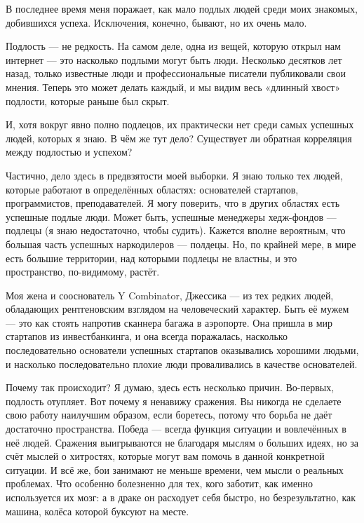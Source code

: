 \documentclass[ebook,12pt,oneside,openany]{memoir}
\date{}
\begin{document}
\maketitle

В последнее время меня поражает, как мало подлых людей среди моих
знакомых, добившихся успеха. Исключения, конечно, бывают, но их очень
мало. \newline

Подлость — не редкость. На самом деле, одна из вещей, которую открыл
нам интернет — это насколько подлыми могут быть люди. Несколько
десятков лет назад, только известные люди и профессиональные писатели
публиковали свои мнения. Теперь это может делать каждый, и мы видим
весь «длинный хвост» подлости, которые раньше был скрыт. \newline

И, хотя вокруг явно полно подлецов, их практически нет среди самых
успешных людей, которых я знаю. В чём же тут дело? Существует ли
обратная корреляция между подлостью и успехом? \newline

Частично, дело здесь в предвзятости моей выборки. Я знаю только тех
людей, которые работают в определённых областях: основателей
стартапов, программистов, преподавателей. Я могу поверить, что в
других областях есть успешные подлые люди. Может быть, успешные
менеджеры хедж-фондов — подлецы (я знаю недостаточно, чтобы судить).
Кажется вполне вероятным, что большая часть успешных наркодилеров —
полдецы. Но, по крайней мере, в мире есть большие территории, над
которыми подлецы не властны, и это пространство, по-видимому, растёт. \newline

Моя жена и сооснователь Y Combinator, Джессика — из тех редких людей,
обладающих рентгеновским взглядом на человеческий характер. Быть её
мужем — это как стоять напротив сканнера багажа в аэропорте. Она
пришла в мир стартапов из инвестбанкинга, и она всегда поражалась,
насколько последовательно основатели успешных стартапов оказывались
хорошими людьми, и насколько последовательно плохие люди проваливались
в качестве основателей. \newline

Почему так происходит? Я думаю, здесь есть несколько причин.
Во-первых, подлость отупляет. Вот почему я ненавижу сражения. Вы
никогда не сделаете свою работу наилучшим образом, если боретесь,
потому что борьба не даёт достаточно пространства. Победа — всегда
функция ситуации и вовлечённых в неё людей. Сражения выигрываются не
благодаря мыслям о больших идеях, но за счёт мыслей о хитростях,
которые могут вам помочь в данной конкретной ситуации. И всё же, бои
занимают не меньше времени, чем мысли о реальных проблемах. Что
особенно болезненно для тех, кого заботит, как именно используется их
мозг: а в драке он расходует себя быстро, но безрезультатно, как
машина, колёса которой буксуют на месте. \newline
\end{document}
